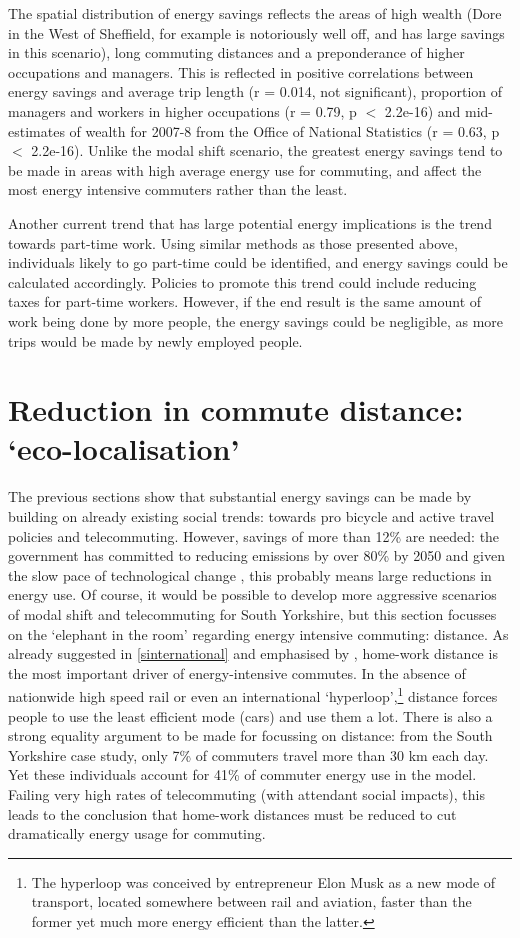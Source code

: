 \documentclass[a4paper, 11pt, twoside]{Thesis}
\begin{document}
The spatial distribution of energy savings reflects the areas of high wealth
(Dore in the West of Sheffield, for example is notoriously well off, and has large savings
in this scenario), long commuting distances and a preponderance of higher occupations
and managers. This is reflected in positive correlations between energy savings
and average trip length (r = 0.014, not significant), proportion of managers
and workers in higher occupations (r = 0.79, p $<$ 2.2e-16) and
mid-estimates of wealth for 2007-8 from the Office of National Statistics
(r = 0.63, p $<$ 2.2e-16). Unlike the modal shift scenario, the
greatest energy savings tend to be made in areas with high average energy
use for commuting, and affect the most energy intensive commuters rather than
the least.

Another current trend that has large potential energy implications is the
trend towards part-time work. Using similar methods as those presented above,
individuals likely to go part-time could be identified, and energy savings
could be calculated accordingly. Policies to promote this trend could
include reducing taxes for part-time workers. However, if the end result is the
same amount of work being done by more people, the energy savings
could be negligible, as more trips would be made by newly employed people.

\section{Reduction in commute distance: `eco-localisation'} \label{fecoloc}
The previous sections show that substantial energy savings can be made by
building on already existing social trends: towards pro bicycle and active
travel policies and telecommuting. However, savings of more than 12\% are needed:
the government has committed to reducing emissions by over 80\% by 2050
and given the slow pace of technological change \citep{Smil2010}, this
probably means large reductions in energy use. Of course, it would be possible
to develop more aggressive scenarios of modal shift and telecommuting for
South Yorkshire, but this section focusses on the `elephant in the room'
regarding energy intensive commuting: distance. As already suggested in
\cref{sinternational} and
emphasised by \citet{Boussauw2009}, home-work distance is the most important
driver of energy-intensive commutes. In the absence of nationwide high speed rail
or even an international
`hyperloop',\footnote{The
hyperloop was conceived by entrepreneur Elon Musk as a new mode of transport,
located somewhere between rail and aviation, faster than the former yet much
more energy efficient than the latter.
}
distance forces people to use the least efficient mode
(cars) and use them a lot. There is also a strong equality argument to
be made for focussing on distance: from the South Yorkshire case study,
only 7\% of commuters travel more than 30 km each day. Yet these individuals
account for 41\% of commuter energy use in the model. Failing very high
rates of telecommuting (with attendant social impacts),
this leads to the conclusion that home-work distances must be reduced to
cut dramatically energy usage for commuting.
\end{document}
